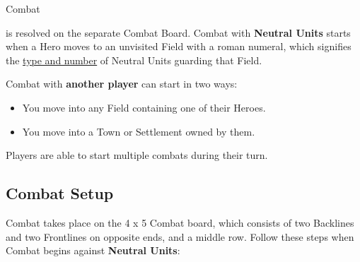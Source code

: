 
\begin{multicols}{2}

\hypertarget{Combat}{Combat} is resolved on the separate Combat Board.
Combat with \textbf{Neutral Units} starts when a Hero moves to an unvisited Field with a roman numeral, which signifies the \hyperlink{Difficulty}{type and number} of Neutral Units guarding that Field.

Combat with \textbf{another player} can start in two ways:
\begin{itemize}
  \item You move into any Field containing one of their Heroes.
  \item You move into a Town or Settlement owned by them.
\end{itemize}
Players are able to start multiple combats during their turn.

\subsection*{\hypertarget{Combatsetup}{Combat Setup}}

Combat takes place on the 4 x 5 Combat board, which consists of two Backlines and two Frontlines on opposite ends, and a middle row.
Follow these steps when Combat begins against \textbf{Neutral Units}:


\end{multicols}
